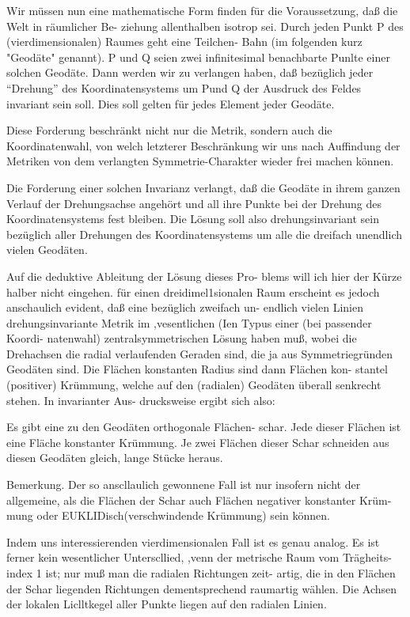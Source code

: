 Wir müssen nun eine mathematische Form finden
für die Voraussetzung, daß die Welt in räumlicher Be-
ziehung allenthalben isotrop sei. Durch jeden Punkt P
des (vierdimensionalen) Raumes geht eine Teilchen-
Bahn (im folgenden kurz "Geodäte" genannt). P und
Q seien zwei infinitesimal benachbarte Punl\:te einer
solchen Geodäte. Dann werden wir zu verlangen haben, daß bezüglich jeder \enquote{Drehung} des Koordinatensystems
um Pund Q der Ausdruck des Feldes invariant sein
soll. Dies soll gelten für jedes Element jeder Geodäte.

Diese Forderung beschränkt nicht nur die Metrik,
sondern auch die Koordinatenwahl, von welch letzterer
Beschränkung wir uns nach Auffindung der Metriken
von dem verlangten Symmetrie-Charakter wieder frei
machen können.

Die Forderung einer solchen Invarianz verlangt, daß
die Geodäte in ihrem ganzen Verlauf der Drehungsachse
angehört und all ihre Punkte bei der Drehung des
Koordinatensystems fest bleiben. Die Lösung soll also
drehungsinvariant sein bezüglich aller Drehungen des
Koordinatensystems um alle die dreifach unendlich
vielen Geodäten.

Auf die deduktive Ableitung der Lösung dieses Pro-
blems will ich hier der Kürze halber nicht eingehen.
für einen dreidimel1sionalen Raum erscheint es jedoch
anschaulich evident, daß eine bezüglich zweifach un-
endlich vielen Linien drehungsinvariante Metrik im
,vesentlichen (Ien Typus einer (bei passender Koordi-
natenwahl) zentralsymmetrischen Lösung haben muß,
wobei die Drehachsen die radial verlaufenden Geraden
sind, die ja aus Symmetriegründen Geodäten sind. Die
Flächen konstanten Radius sind dann Flächen kon-
stantel (positiver) Krümmung, welche auf den (radialen)
Geodäten überall senkrecht stehen. In invarianter Aus-
drucksweise ergibt sich also:

Es gibt eine zu den Geodäten orthogonale Flächen-
schar. Jede dieser Flächen ist eine Fläche konstanter
Krümmung. Je zwei Flächen dieser Schar schneiden
aus diesen Geodäten gleich, lange Stücke heraus.

Bemerkung. Der so anscllaulich gewonnene Fall
ist nur insofern nicht der allgemeine, als die Flächen
der Schar auch Flächen negativer konstanter Krüm-
mung oder EUKLIDisch(verschwindende Krümmung) sein
können.

Indem uns interessierenden vierdimensionalen Fall
ist es genau analog. Es ist ferner kein wesentlicher
Unterscllied, ,venn der metrische Raum vom Trägheits-
index 1 ist; nur muß man die radialen Richtungen zeit-
artig, die in den Flächen der Schar liegenden Richtungen
dementsprechend raumartig wählen. Die Achsen der
lokalen Liclltkegel aller Punkte liegen auf den radialen
Linien.

